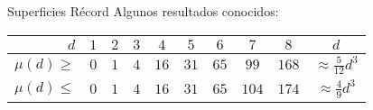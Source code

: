 \begin{surferIntroPage}{Superficies Récord}
    Algunos resultados conocidos:
    
   \begin{center}
      \begin{tabular}{r|cccccccc|c}
        $d$ & $1$ & $2$ & $3$ & $4$ & $5$ & $6$ & $7$ & $8$ & $d$\\
        \hline
        \hline
        \rule{0pt}{1.2em}$\mu(d)\ge$ & $0$ & $1$ & $4$ & $16$ & $31$ & $65$ &
        $99$ & $168$ & 
        $\approx \frac{5}{12}d^3$\\[0.3em]
        \hline
        \rule{0pt}{1.2em}$\mu(d)\le$ & $0$ & $1$ & $4$ & $16$ & $31$ & $65$ &
        $104$ & $174$ & $\approx \frac{4}{9}d^3$
      \end{tabular}
    \end{center}
  \end{surferIntroPage}
  